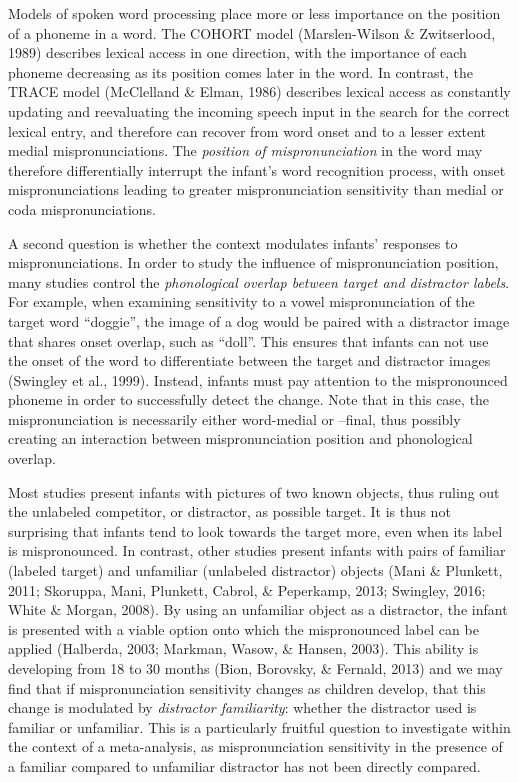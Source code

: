 \documentclass[man]{apa6}
\begin{document}
Models of spoken word processing place more or less importance on the position of a phoneme in a word. The COHORT model (Marslen-Wilson \& Zwitserlood, 1989) describes lexical access in one direction, with the importance of each phoneme decreasing as its position comes later in the word. In contrast, the TRACE model (McClelland \& Elman, 1986) describes lexical access as constantly updating and reevaluating the incoming speech input in the search for the correct lexical entry, and therefore can recover from word onset and to a lesser extent medial mispronunciations. The \emph{position of mispronunciation} in the word may therefore differentially interrupt the infant's word recognition process, with onset mispronunciations leading to greater mispronunciation sensitivity than medial or coda mispronunciations.

A second question is whether the context modulates infants' responses to mispronunciations. In order to study the influence of mispronunciation position, many studies control the \emph{phonological overlap between target and distractor labels}. For example, when examining sensitivity to a vowel mispronunciation of the target word \enquote{doggie}, the image of a dog would be paired with a distractor image that shares onset overlap, such as \enquote{doll}. This ensures that infants can not use the onset of the word to differentiate between the target and distractor images (Swingley et al., 1999). Instead, infants must pay attention to the mispronounced phoneme in order to successfully detect the change. Note that in this case, the mispronunciation is necessarily either word-medial or --final, thus possibly creating an interaction between mispronunciation position and phonological overlap.

Most studies present infants with pictures of two known objects, thus ruling out the unlabeled competitor, or distractor, as possible target. It is thus not surprising that infants tend to look towards the target more, even when its label is mispronounced. In contrast, other studies present infants with pairs of familiar (labeled target) and unfamiliar (unlabeled distractor) objects (Mani \& Plunkett, 2011; Skoruppa, Mani, Plunkett, Cabrol, \& Peperkamp, 2013; Swingley, 2016; White \& Morgan, 2008). By using an unfamiliar object as a distractor, the infant is presented with a viable option onto which the mispronounced label can be applied (Halberda, 2003; Markman, Wasow, \& Hansen, 2003). This ability is developing from 18 to 30 months (Bion, Borovsky, \& Fernald, 2013) and we may find that if mispronunciation sensitivity changes as children develop, that this change is modulated by \emph{distractor familiarity}: whether the distractor used is familiar or unfamiliar. This is a particularly fruitful question to investigate within the context of a meta-analysis, as mispronunciation sensitivity in the presence of a familiar compared to unfamiliar distractor has not been directly compared.
\end{document}
